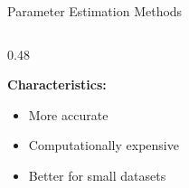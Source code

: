 \documentclass[aspectratio=169]{beamer}
\begin{document}
\begin{frame}{Parameter Estimation Methods}
\begin{columns}[T]
\begin{column}{0.48\textwidth}
\vspace{0.2cm}

\textbf{Characteristics:}
\begin{itemize}
\item More accurate
\item Computationally expensive
\item Better for small datasets
\end{itemize}

\end{column}

\end{columns}

\end{frame}

\end{document}

